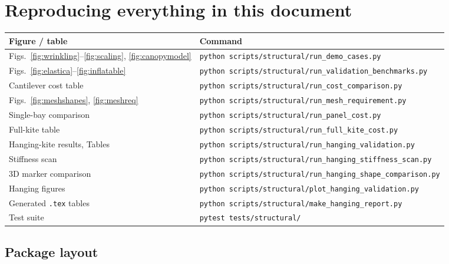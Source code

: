 \documentclass[11pt,a4paper]{article}
\newcommand{\code}[1]{\texttt{\small #1}}
\begin{document}
\section{Reproducing everything in this document}

\begin{table}[H]
\centering
\small
\begin{tabular}{ll}
\toprule
Figure / table & Command\\
\midrule
Figs.~\ref{fig:wrinkling}--\ref{fig:scaling}, \ref{fig:canopymodel}
 & \code{python scripts/structural/run\_demo\_cases.py}\\
Figs.~\ref{fig:elastica}--\ref{fig:inflatable}
 & \code{python scripts/structural/run\_validation\_benchmarks.py}\\
Cantilever cost table & \code{python scripts/structural/run\_cost\_comparison.py}\\
Figs.~\ref{fig:meshshapes}, \ref{fig:meshreq}
 & \code{python scripts/structural/run\_mesh\_requirement.py}\\
Single-bay comparison & \code{python scripts/structural/run\_panel\_cost.py}\\
Full-kite table & \code{python scripts/structural/run\_full\_kite\_cost.py}\\
Hanging-kite results, Tables & \code{python scripts/structural/run\_hanging\_validation.py}\\
Stiffness scan & \code{python scripts/structural/run\_hanging\_stiffness\_scan.py}\\
3D marker comparison & \code{python scripts/structural/run\_hanging\_shape\_comparison.py}\\
Hanging figures & \code{python scripts/structural/plot\_hanging\_validation.py}\\
Generated \code{.tex} tables & \code{python scripts/structural/make\_hanging\_report.py}\\
Test suite & \code{pytest tests/structural/}\\
\bottomrule
\end{tabular}
\end{table}

\subsection{Package layout}
\end{document}
